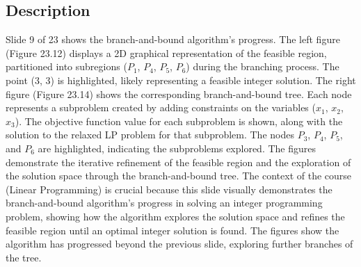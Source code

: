 \documentclass{article}%
\begin{document}
\subsection{Description}%
Slide 9 of 23 shows the branch-and-bound algorithm's progress. The left figure (Figure 23.12) displays a 2D graphical representation of the feasible region, partitioned into subregions ($P_1$, $P_4$, $P_5$, $P_6$) during the branching process.  The point (3, 3) is highlighted, likely representing a feasible integer solution. The right figure (Figure 23.14) shows the corresponding branch-and-bound tree. Each node represents a subproblem created by adding constraints on the variables ($x_1$, $x_2$, $x_3$). The objective function value for each subproblem is shown, along with the solution to the relaxed LP problem for that subproblem.  The nodes $P_3$, $P_4$, $P_5$, and $P_6$ are highlighted, indicating the subproblems explored. The figures demonstrate the iterative refinement of the feasible region and the exploration of the solution space through the branch-and-bound tree. The context of the course (Linear Programming) is crucial because this slide visually demonstrates the branch-and-bound algorithm's progress in solving an integer programming problem, showing how the algorithm explores the solution space and refines the feasible region until an optimal integer solution is found.  The figures show the algorithm has progressed beyond the previous slide, exploring further branches of the tree.%
\end{document}
